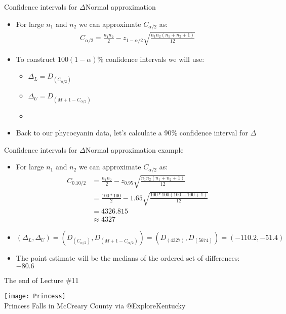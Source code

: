 \documentclass[xcolor=dvipsnames]{beamer}
\begin{document}
\begin{frame}{Confidence intervals for $\Delta$}{Normal approximation}
	\begin{itemize}
		\item For large $n_1$ and $n_2$ we can approximate $C_{\alpha / 2}$ as:
		\begin{gather*}
		C_{\alpha / 2} = \frac{n_1 n_2}{2} - z_{1-\alpha / 2} \sqrt{\frac{n_1 n_2(n_1+n_2+1)}{12}}
		\end{gather*}
		\item To construct $100(1-\alpha) \%$ confidence intervals we will use:
		\begin{itemize}
			\item $\Delta_L = D_{(C_{\alpha / 2})}$
			\item $\Delta_U = D_{(M + 1 - C_{\alpha / 2})}$
			\item[]
		\end{itemize}
	\item Back to our phycocyanin data, let's calculate a 90\% confidence interval for $\Delta$
	\end{itemize}
\end{frame}

\begin{frame}{Confidence intervals for $\Delta$}{Normal approximation example}
\begin{itemize}
	\item For large $n_1$ and $n_2$ we can approximate $C_{\alpha / 2}$ as:
	\begin{align*}
	C_{0.10 / 2} &= \frac{n_1 n_2}{2} - z_{0.95} \sqrt{\frac{n_1 n_2(n_1+n_2+1)}{12}} \\
	&=\frac{100*100}{2} - 1.65 \sqrt{\frac{100*100(100+100+1)}{12}} \\
	&= 4326.815 \\
	&\approx 4327
	\end{align*}
	\item $(\Delta_L, \Delta_U) = \left(D_{(C_{\alpha / 2})}, D_{(M + 1 - C_{\alpha / 2})} \right) = \left(D_{(4327)}, D_{(5674)}\right) = (-110.2, -51.4)$
	\item The point estimate will be the medians of the ordered set of differences: $-80.6$
\end{itemize}
\end{frame}

\begin{frame}{The end of Lecture \#11}
	\begin{center}
		\texttt{[image: Princess]} \\
		{\tiny Princess Falls in McCreary County via @ExploreKentucky}
	\end{center}
\end{frame}
\end{document}
